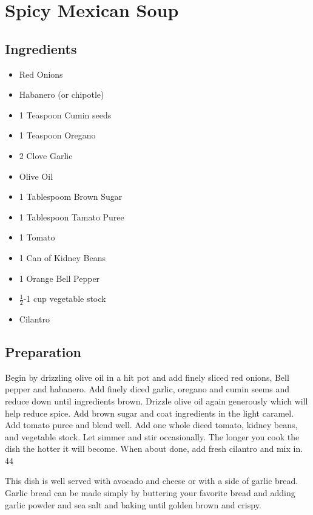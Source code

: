 \thispagestyle{fancy}
\section{Spicy Mexican Soup}
\AddToShipoutPicture*{\MexicanSoup}

\subsection*{Ingredients}
\begin{multicols}{3}
	\begin{itemize}
		\item Red Onions
		\item Habanero (or chipotle)
		\item 1 Teaspoon Cumin seeds
		\item 1 Teaspoon Oregano
		\item 2 Clove Garlic
		\item Olive Oil
		\item 1 Tablespoom Brown Sugar
		\item 1 Tablespoon Tamato Puree
		\item 1 Tomato
		\item 1 Can of Kidney Beans
		\item 1 Orange Bell Pepper
		\item $\frac{1}{2}$-1 cup vegetable stock
		\item Cilantro
	\end{itemize}
\end{multicols}

\subsection*{Preparation}

Begin by drizzling olive oil in a hit pot and add finely sliced red onions, Bell pepper and habanero. Add finely diced garlic, oregano and cumin seems and reduce down until ingredients brown. Drizzle olive oil again generously which will help reduce spice. Add brown sugar and coat ingredients in the light caramel. Add tomato puree and blend well. Add one whole diced tomato, kidney beans, and vegetable stock. Let simmer and stir occasionally. The longer you cook the dish the hotter it will become. When about done, add fresh cilantro and mix in. 44

\tab This dish is well served with avocado and cheese or with a side of garlic bread. Garlic bread can be made simply by buttering your favorite bread and adding garlic powder and sea salt and baking until golden brown and crispy. 